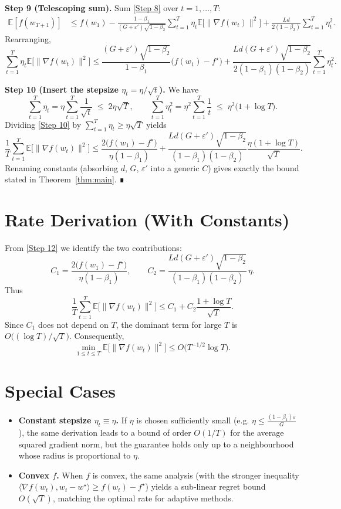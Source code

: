 \documentclass{article}
\newcommand{\EE}{\mathbb{E}}
\begin{document}
\noindent\textbf{Step 9 (Telescoping sum).}  
Sum \eqref{Step 8} over $t=1,\dots,T$:
\begin{align}
\EE[f(w_{T+1})] 
&\le f(w_{1})
 -\frac{1-\beta_{1}}{(G+\varepsilon')\sqrt{1-\beta_{2}}}
   \sum_{t=1}^{T}\eta_{t}\EE\!\bigl[\|\nabla f(w_{t})\|^{2}\bigr]
 +\frac{L d}{2(1-\beta_{2})}\sum_{t=1}^{T}\eta_{t}^{2}. \tag{Step 9}
\end{align}
Rearranging,
\[
\sum_{t=1}^{T}\eta_{t}\EE\!\bigl[\|\nabla f(w_{t})\|^{2}\bigr]
\le
\frac{(G+\varepsilon')\sqrt{1-\beta_{2}}}{1-\beta_{1}}
\bigl(f(w_{1})-f^{\star}\bigr)
+\frac{L d (G+\varepsilon')\sqrt{1-\beta_{2}}}{2(1-\beta_{1})(1-\beta_{2})}
   \sum_{t=1}^{T}\eta_{t}^{2}. \tag{Step 10}
\]

\noindent\textbf{Step 10 (Insert the stepsize $\eta_{t}=\eta/\sqrt{t}$).}  
We have
\[
\sum_{t=1}^{T}\eta_{t}= \eta\sum_{t=1}^{T}\frac{1}{\sqrt{t}}
\;\le\;
2\eta\sqrt{T},
\qquad
\sum_{t=1}^{T}\eta_{t}^{2}= \eta^{2}\sum_{t=1}^{T}\frac{1}{t}
\;\le\;
\eta^{2}\bigl(1+\log T\bigr). \tag{Step 11}
\]
Dividing \eqref{Step 10} by $\sum_{t=1}^{T}\eta_{t}\ge\eta\sqrt{T}$ yields
\[
\frac{1}{T}\sum_{t=1}^{T}\EE\!\bigl[\|\nabla f(w_{t})\|^{2}\bigr]
\le
\frac{2\bigl(f(w_{1})-f^{\star}\bigr)}{\eta(1-\beta_{1})}
+
\frac{L d (G+\varepsilon')\sqrt{1-\beta_{2}}}{(1-\beta_{1})(1-\beta_{2})}
   \frac{\eta(1+\log T)}{\sqrt{T}}. \tag{Step 12}
\]
Renaming constants (absorbing $d$, $G$, $\varepsilon'$ into a generic $C$) gives exactly the bound stated in Theorem~\ref{thm:main}. ∎

\section*{Rate Derivation (With Constants)}
From \eqref{Step 12} we identify the two contributions:
\[
C_{1}= \frac{2\bigl(f(w_{1})-f^{\star}\bigr)}{\eta(1-\beta_{1})},
\qquad
C_{2}= \frac{L d (G+\varepsilon')\sqrt{1-\beta_{2}}}{(1-\beta_{1})(1-\beta_{2})}\,\eta .
\]
Thus
\[
\frac{1}{T}\sum_{t=1}^{T}\EE\!\bigl[\|\nabla f(w_{t})\|^{2}\bigr]
\le C_{1}+ C_{2}\frac{1+\log T}{\sqrt{T}} .
\]
Since $C_{1}$ does not depend on $T$, the dominant term for large $T$ is $O\!\bigl((\log T)/\sqrt{T}\bigr)$.  Consequently,
\[
\min_{1\le t\le T}\EE\!\bigl[\|\nabla f(w_{t})\|^{2}\bigr]
\le O\!\bigl(T^{-1/2}\log T\bigr).
\]

\section*{Special Cases}
\begin{itemize}
\item \textbf{Constant stepsize $\eta_{t}\equiv\eta$.}  
If $\eta$ is chosen sufficiently small (e.g. $\eta\le \frac{(1-\beta_{1})\varepsilon}{G}$), the same derivation leads to a bound of order $O(1/T)$ for the average squared gradient norm, but the guarantee holds only up to a neighbourhood whose radius is proportional to $\eta$.
\item \textbf{Convex $f$.}  
When $f$ is convex, the same analysis (with the stronger inequality $\langle\nabla f(w_{t}),w_{t}-w^{\star}\rangle\ge f(w_{t})-f^{\star}$) yields a sub‑linear regret bound $O(\sqrt{T})$, matching the optimal rate for adaptive methods.
\end{itemize}
\end{document}
